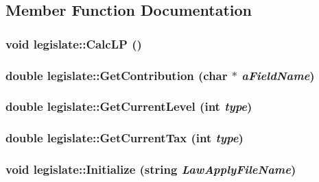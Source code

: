 \subsection{Member Function Documentation}
\hypertarget{classlegislate_a0e5d387c97dfb83092af5011888639b5}{
\subsubsection[{CalcLP}]{\setlength{\rightskip}{0pt plus 5cm}void legislate::CalcLP ()}}
\label{classlegislate_a0e5d387c97dfb83092af5011888639b5}
\hypertarget{classlegislate_a492a5696879bad9d24c6f4f882f0f4fd}{
\subsubsection[{GetContribution}]{\setlength{\rightskip}{0pt plus 5cm}double legislate::GetContribution (char $\ast$ {\em aFieldName})}}
\label{classlegislate_a492a5696879bad9d24c6f4f882f0f4fd}
\hypertarget{classlegislate_afaa572033956815914b8d918c75c2688}{
\subsubsection[{GetCurrentLevel}]{\setlength{\rightskip}{0pt plus 5cm}double legislate::GetCurrentLevel (int {\em type})}}
\label{classlegislate_afaa572033956815914b8d918c75c2688}
\hypertarget{classlegislate_a5b9e7dced822a702531be6014a5d8384}{
\subsubsection[{GetCurrentTax}]{\setlength{\rightskip}{0pt plus 5cm}double legislate::GetCurrentTax (int {\em type})}}
\label{classlegislate_a5b9e7dced822a702531be6014a5d8384}
\hypertarget{classlegislate_ad843a70145258602b6498888fcc6071b}{
\subsubsection[{Initialize}]{\setlength{\rightskip}{0pt plus 5cm}void legislate::Initialize (string {\em LawApplyFileName})}}
